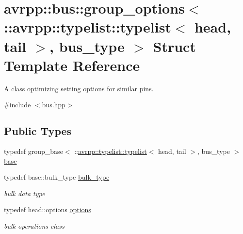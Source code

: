 \hypertarget{structavrpp_1_1bus_1_1group__options_3_01_1_1avrpp_1_1typelist_1_1typelist_3_01head_00_01tail_01_4_00_01bus__type_01_4}{
\section{avrpp::bus::group\_\-options$<$ ::avrpp::typelist::typelist$<$ head, tail $>$, bus\_\-type $>$ Struct Template Reference}
\label{structavrpp_1_1bus_1_1group__options_3_01_1_1avrpp_1_1typelist_1_1typelist_3_01head_00_01tail_01_4_00_01bus__type_01_4}
}


A class optimizing setting options for similar pins.  




{\ttfamily \#include $<$bus.hpp$>$}

\subsection*{Public Types}
\begin{DoxyCompactItemize}
\item 
typedef group\_\-base$<$ ::\hyperlink{structavrpp_1_1typelist_1_1typelist}{avrpp::typelist::typelist}$<$ head, tail $>$, bus\_\-type $>$ \hyperlink{structavrpp_1_1bus_1_1group__options_3_01_1_1avrpp_1_1typelist_1_1typelist_3_01head_00_01tail_01_4_00_01bus__type_01_4_a554c7dd8c5ba7b549a67054e05c60174}{base}
\item 
typedef base::bulk\_\-type \hyperlink{structavrpp_1_1bus_1_1group__options_3_01_1_1avrpp_1_1typelist_1_1typelist_3_01head_00_01tail_01_4_00_01bus__type_01_4_a3606604692e3d11f3b7db4a71cc57fcf}{bulk\_\-type}
\begin{DoxyCompactList}\small\item\em bulk data type \item\end{DoxyCompactList}\item 
typedef head::options \hyperlink{structavrpp_1_1bus_1_1group__options_3_01_1_1avrpp_1_1typelist_1_1typelist_3_01head_00_01tail_01_4_00_01bus__type_01_4_a73d7732b7030717f0fa5c2f7d7fa5663}{options}
\begin{DoxyCompactList}\small\item\em bulk operations class \item\end{DoxyCompactList}\end{DoxyCompactItemize}
